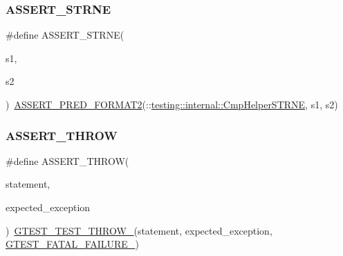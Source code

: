 \mbox{\label{_obj__test_2lib_2googletest-release-1_88_81_2googletest_2include_2gtest_2gtest_8h_a3d679660ac1b2f9f6e6c7608452af923}} 
\subsubsection{\texorpdfstring{ASSERT\_STRNE}{ASSERT\_STRNE}}
{\footnotesize\ttfamily \#define A\+S\+S\+E\+R\+T\+\_\+\+S\+T\+R\+NE(\begin{DoxyParamCaption}\item[{}]{s1,  }\item[{}]{s2 }\end{DoxyParamCaption})~\mbox{\hyperlink{_obj__test_2lib_2googletest-release-1_88_81_2googletest_2include_2gtest_2gtest__pred__impl_8h_ac452685a1a98ea3d96eb956a062ee210}{A\+S\+S\+E\+R\+T\+\_\+\+P\+R\+E\+D\+\_\+\+F\+O\+R\+M\+A\+T2}}(\+::\mbox{\hyperlink{namespacetesting_1_1internal_af2d31c77ce73e1003a64bd7ca3564bbe}{testing\+::internal\+::\+Cmp\+Helper\+S\+T\+R\+NE}}, s1, s2)}

\mbox{\label{_obj__test_2lib_2googletest-release-1_88_81_2googletest_2include_2gtest_2gtest_8h_aedb1eddae6c2a2430b0e7b7e03b4f052}} 
\subsubsection{\texorpdfstring{ASSERT\_THROW}{ASSERT\_THROW}}
{\footnotesize\ttfamily \#define A\+S\+S\+E\+R\+T\+\_\+\+T\+H\+R\+OW(\begin{DoxyParamCaption}\item[{}]{statement,  }\item[{}]{expected\+\_\+exception }\end{DoxyParamCaption})~\mbox{\hyperlink{_obj__test_2lib_2googletest-release-1_88_81_2googletest_2include_2gtest_2internal_2gtest-internal_8h_a3f71db93eaf30b0cfca9612b9ac32106}{G\+T\+E\+S\+T\+\_\+\+T\+E\+S\+T\+\_\+\+T\+H\+R\+O\+W\+\_\+}}(statement, expected\+\_\+exception, \mbox{\hyperlink{_obj__test_2lib_2googletest-release-1_88_81_2googletest_2include_2gtest_2internal_2gtest-internal_8h_a0f9a4c3ea82cc7bf4478eaffdc168358}{G\+T\+E\+S\+T\+\_\+\+F\+A\+T\+A\+L\+\_\+\+F\+A\+I\+L\+U\+R\+E\+\_\+}})}


